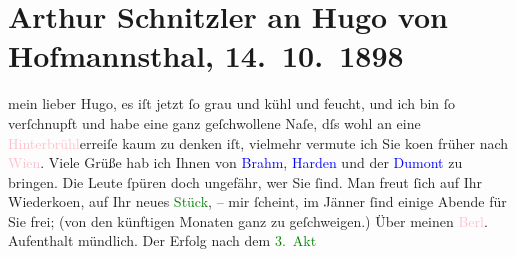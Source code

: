 

               \section[Arthur Schnitzler an Hugo von Hofmannsthal, 14. 10. 1898]{ Arthur Schnitzler an Hugo von Hofmannsthal,
                    14. 10. 1898}\nopagebreak{}\rehead{ }\normalsize\beginnumbering{} \toendnotes[C]{\smallbreak\pagebreak[2]} 
\toendnotes[C]{\smallbreak}\pstart
           \noindent{}{\pb}mein lieber Hugo, es iſt jetzt ſo grau und kühl und feucht, und
                    ich bin ſo verſchnupft und habe eine ganz geſchwollene Naſe, dſs wohl an eine
                        \textcolor{pink}{Hinterbrühl}{}\ledrightnote{\textcolor{pink}{Hinterbrühl}}erreiſe kaum zu denken iſt,
                    vielmehr vermute ich Sie ko{\geminationm}en früher nach \textcolor{pink}{Wien}{}\ledrightnote{\textcolor{pink}{Wien}}. Viele Grüße hab ich Ihnen von \textcolor{blue}{Brahm}{}\ledrightnote{\textcolor{blue}{Otto Brahm}}, \textcolor{blue}{Harden}{}\ledrightnote{\textcolor{blue}{Maximilian Harden}} und der \textcolor{blue}{Dumont}{}\ledrightnote{\textcolor{blue}{Louise Dumont}} zu
                    bringen. Die Leute ſpüren doch ungefähr, wer Sie ſind. Man freut ſich auf Ihr
                        Wiederko{\geminationm}en, auf Ihr neues \textcolor{green}{Stück}{}, {\pb}– mir ſcheint, im Jänner{ }ſind einige Abende für Sie frei; (von
                    den künftigen Monaten ganz zu geſchweigen.)\pend
           \pstart
           Über meinen \textcolor{pink}{Berl}{}\ledrightnote{\textcolor{pink}{Berlin}}. Aufenthalt mündlich. Der
                    Erfolg nach dem \textcolor{green}{3. Akt}{}
